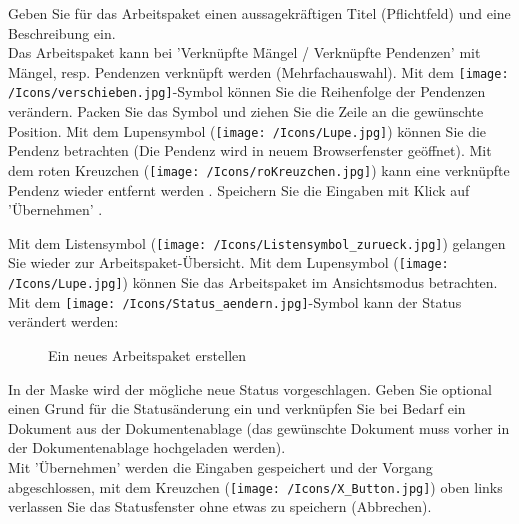Geben Sie für das Arbeitspaket einen aussagekräftigen Titel (Pflichtfeld) und eine Beschreibung ein.\\
Das Arbeitspaket kann bei 'Verknüpfte Mängel / Verknüpfte Pendenzen' mit Mängel, resp. Pendenzen verknüpft werden (Mehrfachauswahl). Mit dem \texttt{[image: /Icons/verschieben.jpg]}-Symbol  können Sie die Reihenfolge der Pendenzen verändern. Packen Sie das Symbol und ziehen Sie die Zeile an die gewünschte Position. Mit dem Lupensymbol (\texttt{[image: /Icons/Lupe.jpg]})  können Sie die Pendenz betrachten (Die Pendenz wird in neuem Browserfenster geöffnet). Mit dem roten Kreuzchen (\texttt{[image: /Icons/roKreuzchen.jpg]}) kann eine verknüpfte Pendenz wieder entfernt werden . Speichern Sie die Eingaben mit Klick auf 'Übernehmen' .

\vspace{\baselineskip}

Mit dem Listensymbol (\texttt{[image: /Icons/Listensymbol\_zurueck.jpg]})  gelangen Sie wieder zur Arbeitspaket-Übersicht. Mit dem Lupensymbol (\texttt{[image: /Icons/Lupe.jpg]})  können Sie das Arbeitspaket im Ansichtsmodus betrachten. Mit dem \texttt{[image: /Icons/Status\_aendern.jpg]}-Symbol  kann der Status verändert werden:

\begin{figure}[H]
\caption{Ein neues Arbeitspaket erstellen}
\end{figure}

In der Maske wird der mögliche neue Status vorgeschlagen. Geben Sie optional einen Grund für die Statusänderung ein und verknüpfen Sie bei Bedarf ein Dokument aus der Dokumentenablage (das gewünschte Dokument muss vorher in der Dokumentenablage hochgeladen werden).\\
Mit 'Übernehmen' werden die Eingaben gespeichert und der Vorgang abgeschlossen, mit dem Kreuzchen (\texttt{[image: /Icons/X\_Button.jpg]}) oben links verlassen Sie das Statusfenster ohne etwas zu speichern (Abbrechen).

